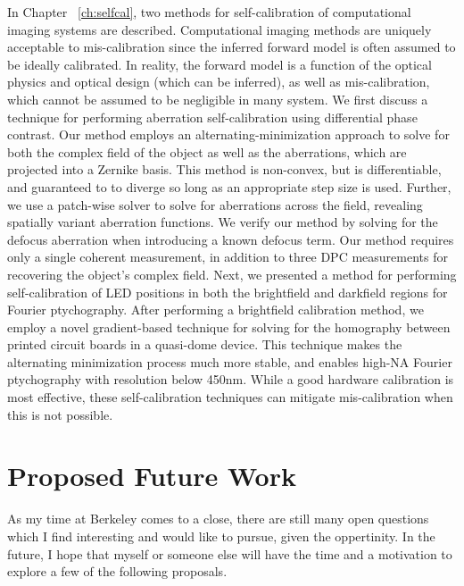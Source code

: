 In Chapter ~\ref{ch:selfcal}, two methods for self-calibration of computational imaging systems are described. Computational imaging methods are uniquely acceptable to mis-calibration since the inferred forward model is often assumed to be ideally calibrated. In reality, the forward model is a function of the optical physics and optical design (which can be inferred), as well as mis-calibration, which cannot be assumed to be negligible in many system. We first discuss a technique for performing aberration self-calibration using differential phase contrast. Our method employs an alternating-minimization approach to solve for both the complex field of the object as well as the aberrations, which are projected into a Zernike basis. This method is non-convex, but is differentiable, and guaranteed to to diverge so long as an appropriate step size is used. Further, we use a patch-wise solver to solve for aberrations across the field, revealing spatially variant aberration functions. We verify our method by solving for the defocus aberration when introducing a known defocus term. Our method requires only a single coherent measurement, in addition to three DPC measurements for recovering the object's complex field. Next, we presented a method for performing self-calibration of LED positions in both the brightfield and darkfield regions for Fourier ptychography. After performing a brightfield calibration method, we employ a novel gradient-based technique for solving for the homography between printed circuit boards in a quasi-dome device. This technique makes the alternating minimization process much more stable, and enables high-NA Fourier ptychography with resolution below 450nm. While a good hardware calibration is most effective, these self-calibration techniques can mitigate mis-calibration when this is not possible.

\section{Proposed Future Work}
As my time at Berkeley comes to a close, there are still many open questions which I find interesting and would like to pursue, given the oppertinity. In the future, I hope that myself or someone else will have the time and a motivation to explore a few of the following proposals.

